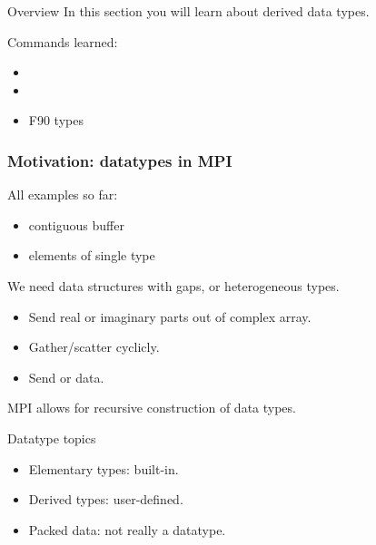 
\begin{frame}[containsverbatim]{Overview}
  In this section you will learn about derived data types.

  Commands learned:
  \begin{itemize}
  \item {}
  \item {}
  \item F90 types
  \end{itemize}
\end{frame}


\begin{frame}[containsverbatim]\frametitle{Motivation: datatypes in MPI}
  All examples so far: 
  \begin{itemize}
  \item contiguous buffer
  \item elements of single type
  \end{itemize}
  We need data structures with gaps, or heterogeneous types.
  \begin{itemize}
  \item Send real or imaginary parts out of complex array.
  \item Gather/scatter cyclicly.
  \item Send  or  data.
  \end{itemize}
  MPI allows for recursive construction of data types.
\end{frame}

\begin{frame}{Datatype topics}
  \begin{itemize}
  \item Elementary types: built-in.
  \item Derived types: user-defined.
  \item Packed data: not really a datatype.
  \end{itemize}
\end{frame}

